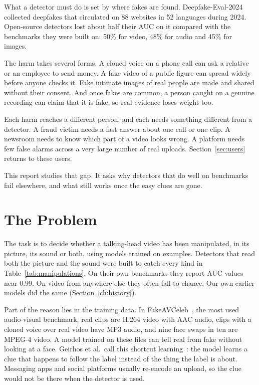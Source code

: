 What a detector must do is set by where fakes are found. Deepfake-Eval-2024~\cite{dfeval2024}
collected deepfakes that circulated on 88 websites in 52 languages during 2024.
Open-source detectors lost about half their AUC on it compared with the
benchmarks they were built on: 50\% for video, 48\% for audio and 45\% for
images.

The harm takes several forms. A cloned voice on a phone call can ask a
relative or an employee to send money. A fake video of a public figure can
spread widely before anyone checks it. Fake intimate images of real people are
made and shared without their consent. And once fakes are common, a person
caught on a genuine recording can claim that it is fake, so real evidence
loses weight too.

Each harm reaches a different person, and each needs something different
from a detector. A fraud victim needs a fast answer about one call or one
clip. A newsroom needs to know which part of a video looks wrong. A platform
needs few false alarms across a very large number of real uploads.
Section~\ref{sec:users} returns to these users.

This report studies that gap. It asks why detectors that do well on
benchmarks fail elsewhere, and what still works once the easy clues are gone.

\section{The Problem}
\label{sec:problem}

The task is to decide whether a talking-head video has been manipulated, in
its picture, its sound or both, using models trained on examples. Detectors
that read both the picture and the sound were built to catch every kind in
Table~\ref{tab:manipulations}. On their own benchmarks they report AUC values
near 0.99. On video from anywhere else they often fall to chance. Our own
earlier models did the same (Section~\ref{ch:history}).

Part of the reason lies in the training data. In FakeAVCeleb~\cite{fakeavceleb},
the most used audio-visual benchmark, real clips are H.264 video with AAC
audio, clips with a cloned voice over real video have MP3 audio, and nine face
swaps in ten are MPEG-4 video. A model trained on these files can tell real
from fake without looking at a face. Geirhos et al.\ call this shortcut
learning~\cite{shortcut}: the model learns a clue that happens to follow the
label instead of the thing the label is about. Messaging apps and social
platforms usually re-encode an upload, so the clue would not be there when the
detector is used.

